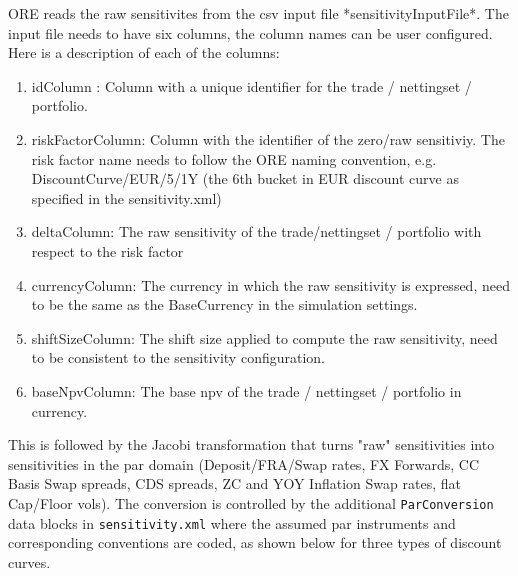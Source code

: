 \documentclass[12pt, a4paper]{article}
\begin{document}
ORE reads the raw sensitivites from the csv input file *sensitivityInputFile*. The input file needs to have six  columns, the column names can be user configured. Here is a description of each of the columns:

\begin{enumerate}
\item idColumn : Column with a unique identifier for the trade / nettingset / portfolio.
\item riskFactorColumn: Column with the identifier of the zero/raw sensitiviy. The risk factor name needs to follow the ORE naming convention, e.g. DiscountCurve/EUR/5/1Y (the 6th bucket in EUR discount curve as specified in the sensitivity.xml)\
\item deltaColumn: The raw sensitivity of the trade/nettingset / portfolio with respect to the risk factor
\item currencyColumn: The currency in which the raw sensitivity is expressed, need to be the same as the BaseCurrency in the simulation settings.
\item shiftSizeColumn: The shift size applied to compute the raw sensitivity, need to be consistent to the sensitivity configuration.
\item baseNpvColumn: The base npv of the trade / nettingset / portfolio in currency.
\end{enumerate}

This is followed by the Jacobi transformation that turns "raw" sensitivities  into sensitivities in the par domain (Deposit/FRA/Swap rates, FX Forwards, CC Basis Swap spreads, 
CDS spreads, ZC and YOY Inflation Swap rates, flat Cap/Floor vols). The conversion is controlled by the additional {\tt ParConversion} data blocks 
in {\tt sensitivity.xml} where the assumed par instruments and corresponding conventions are coded, as shown below for three types of discount curves.
\end{document}
